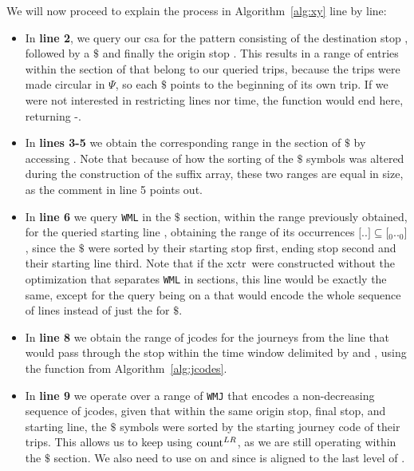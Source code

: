     \medskip
    We will now proceed to explain the process in Algorithm~\ref{alg:xy} line by line:
    \begin{itemize}
        \item In \textbf{line 2}, we query our \gls{csa} for the pattern consisting of the destination stop , followed by a $\$$ and finally the origin stop . This results in a range of entries within the section of  that belong to our queried trips, because the trips were made circular in $\Psi$, so each $\$$ points to the beginning of its own trip. If we were not interested in restricting lines nor time, the function would end here, returning -.
        
        \item In \textbf{lines 3-5} we obtain the corresponding range in the section of $\$$ by accessing \FuncSty{$\Psi$}. Note that because of how the sorting of the $\$$ symbols was altered during the construction of the suffix array, these two ranges are equal in size, as the comment in line 5 points out.
        
        \item In \textbf{line 6} we query \texttt{WML} in the $\$$ section, within the range previously obtained, for the queried starting line , obtaining the range of its occurrences $[$$..$$] \subseteq [$$_0..$$_0]$, since the $\$$ were sorted by their starting stop first, ending stop second and their starting line third. Note that if the \gls{xctr}~were constructed without the optimization that separates \texttt{WML} in sections, this line would be exactly the same, except for the query being on a  that would encode the whole sequence of lines instead of just the  for $\$$.
        
        \item In \textbf{line 8} we obtain the range of jcodes for the journeys from the line  that would pass through the stop  within the time window delimited by  and , using the function  from Algorithm~\ref{alg:jcodes}.
        
        \item In \textbf{line 9} we operate over a range of \texttt{WMJ} that encodes a non-decreasing sequence of jcodes, given that within the same origin stop, final stop, and starting line, the $\$$ symbols were sorted by the starting journey code of their trips. This allows us to keep using $\operatorname{count}^{LR}$, as we are still operating within the $\$$ section. We also need to use  on  and  since  is aligned to the last level of .
        

\end{itemize}
